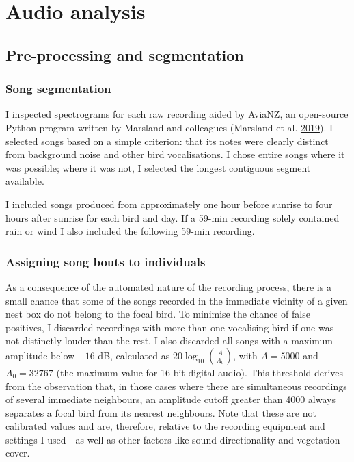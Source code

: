 \documentclass[]{report}
\begin{document}
\hypertarget{audio-analysis}{%
\section{Audio analysis}\label{audio-analysis}}

\hypertarget{pre-processing-and-segmentation}{%
\subsection{Pre-processing and
segmentation}\label{pre-processing-and-segmentation}}

\hypertarget{song-segmentation}{%
\subsubsection{Song segmentation}\label{song-segmentation}}

I inspected spectrograms for each raw recording aided by AviaNZ, an
open-source Python program written by Marsland and colleagues (Marsland
et al. \protect\hyperlink{ref-Marsland2019}{2019}). I selected songs
based on a simple criterion: that its notes were clearly distinct from
background noise and other bird vocalisations. I chose entire songs
where it was possible; where it was not, I selected the longest
contiguous segment available.

I included songs produced from approximately one hour before sunrise to
four hours after sunrise for each bird and day. If a 59-min recording
solely contained rain or wind I also included the following 59-min
recording.

\hypertarget{assigning-song-bouts-to-individuals}{%
\subsubsection{Assigning song bouts to
individuals}\label{assigning-song-bouts-to-individuals}}

As a consequence of the automated nature of the recording process, there
is a small chance that some of the songs recorded in the immediate
vicinity of a given nest box do not belong to the focal bird. To
minimise the chance of false positives, I discarded recordings with more
than one vocalising bird if one was not distinctly louder than the rest.
I also discarded all songs with a maximum amplitude below \(-16\) dB,
calculated as \(20\log_{10}(\frac{A}{A_0})\), with \(A= 5000\) and
\(A_0=32767\) (the maximum value for 16-bit digital audio). This
threshold derives from the observation that, in those cases where there
are simultaneous recordings of several immediate neighbours, an
amplitude cutoff greater than 4000 always separates a focal bird from
its nearest neighbours. Note that these are not calibrated values and
are, therefore, relative to the recording equipment and settings I
used---as well as other factors like sound directionality and vegetation
cover.
\end{document}
